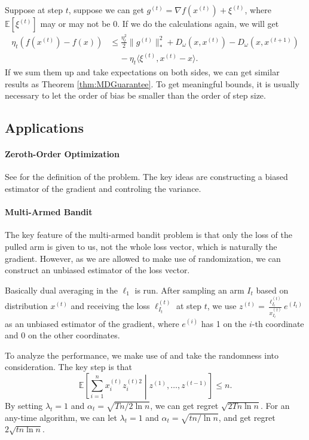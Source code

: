 \documentclass[openany]{book}
\theoremstyle{definition}
\theoremstyle{remark}
\begin{document}
Suppose at step $t$, suppose we can get $g^{(t)}=\nabla f(x^{(t)})+\xi^{(t)}$, where $\mathbb{E}[\xi^{(t)}]$ may or may not be $0$. If we do the calculations again, we will get
\begin{equation*}
    \begin{split}
         \eta_t\left(f(x^{(t)})-f(x)\right) & \le \frac{\eta_t^2}{2}\|g^{(t)}\|_*^2+D_{\omega}(x,x^{(t)})-D_{\omega}(x,x^{(t+1)}) \\
          & \quad\,-\eta_t \langle\xi^{(t)},x^{(t)}-x\rangle.
    \end{split}
\end{equation*}
If we sum them up and take expectations on both sides, we can get similar results as Theorem \ref{thm:MDGuarantee}. To get meaningful bounds, it is usually necessary to let the order of bias be smaller than the order of step size.

\subsection{Applications}
\paragraph{Zeroth-Order Optimization}
See \cite{DJWW15} for the definition of the problem. The key ideas are constructing a biased estimator of the gradient and controling the variance.

\paragraph{Multi-Armed Bandit}
The key feature of the multi-armed bandit problem is that only the loss of the pulled arm is given to us, not the whole loss vector, which is naturally the gradient. However, as we are allowed to make use of randomization, we can construct an unbiased estimator of the loss vector.

Basically dual averaging in the $\ell_1$ is run. After sampling an arm $I_t$ based on distribution $x^{(t)}$ and receiving the loss $\ell_{I_t}^{(t)}$ at step $t$, we use $z^{(t)}=\frac{\ell_{I_t}^{(t)}}{x_{I_t}^{(t)}}e^{(I_t)}$ as an unbiased estimator of the gradient, where $e^{(i)}$ has 1 on the $i$-th coordinate and $0$ on the other coordinates.

To analyze the performance, we make use of  and take the randomness into consideration. The key step is that
\begin{equation}
    \mathbb{E}\left[\sum_{i=1}^{n}x_i^{(t)}z_i^{(t)2}\middle|z^{(1)},\ldots,z^{(t-1)}\right]\le n.
\end{equation}
By setting $\lambda_t=1$ and $\alpha_t=\sqrt{Tn/2\ln n}$, we can get regret $\sqrt{2Tn\ln n}$. For an any-time algorithm, we can let $\lambda_t=1$ and $\alpha_t=\sqrt{tn/\ln n}$, and get regret $2\sqrt{tn\ln n}$.
\end{document}
